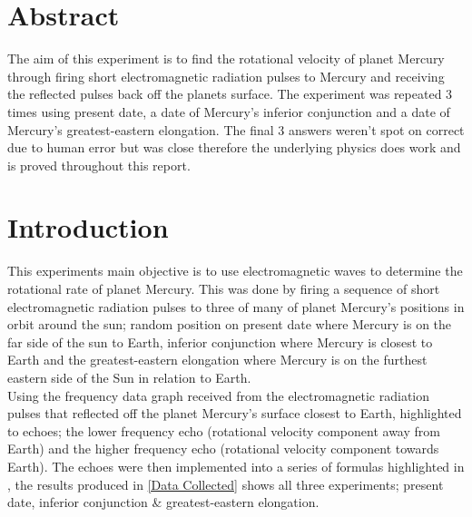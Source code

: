 \documentclass[11pt]{article}
\begin{document}
\begin{multicols}{2}

\section{Abstract}

The aim of this experiment is to find the rotational velocity of planet Mercury through firing short electromagnetic radiation pulses to Mercury and receiving the reflected pulses back off the planets surface. The experiment was repeated 3 times using present date, a date of Mercury’s inferior conjunction and a date of Mercury’s greatest-eastern elongation. The final 3 answers weren't spot on correct due to human error but was close therefore the underlying physics does work and is proved throughout this report.


\section{Introduction}

This experiments main objective is to use electromagnetic waves to determine the rotational rate of planet Mercury. This was done by firing a sequence of short electromagnetic radiation pulses to three of many of planet Mercury’s positions in orbit around the sun; random position on present date where Mercury is on the far side of the sun to Earth, inferior conjunction where Mercury is closest to Earth and the greatest-eastern elongation where Mercury is on the furthest eastern side of the Sun in relation to Earth. \\

Using the frequency data graph received from the electromagnetic radiation pulses that reflected off the planet Mercury's surface closest to Earth, highlighted to echoes; the lower frequency echo (rotational velocity component away from Earth) and the higher frequency echo (rotational velocity component towards Earth). The echoes were then implemented into a series of formulas highlighted in \cite{LLR.1-2018}, the results produced in \cref{Data Collected} shows all three experiments; present date, inferior conjunction \& greatest-eastern elongation.


\end{multicols}
\end{document}
